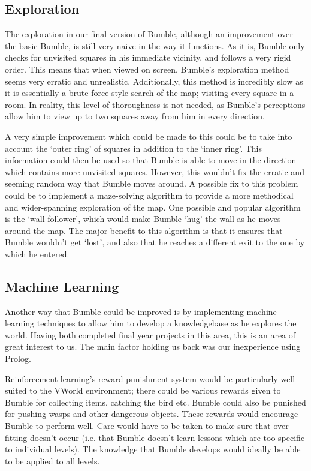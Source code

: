 \documentclass[a4paper,oneside]{report}
\begin{document}
\subsection{Exploration}

The exploration in our final version of Bumble, although an improvement over the basic Bumble, is still very naive in the way it functions. As it is, Bumble only checks for unvisited squares in his immediate vicinity, and follows a very rigid order. This means that when viewed on screen, Bumble's exploration method seems very erratic and unrealistic. Additionally, this method is incredibly slow as it is essentially a brute-force-style search of the map; visiting every square in a room. In reality, this level of thoroughness is not needed, as Bumble's perceptions allow him to view up to two squares away from him in every direction. 

A very simple improvement which could be made to this could be to take into account the `outer ring' of squares in addition to the `inner ring'. This information could then be used so that Bumble is able to move in the direction which contains more unvisited squares. However, this wouldn't fix the erratic and seeming random way that Bumble moves around. A possible fix to this problem could be to implement a maze-solving algorithm to provide a more methodical and wider-spanning exploration of the map. One possible and popular algorithm is the `wall follower', which would make Bumble `hug' the wall as he moves around the map. The major benefit to this algorithm is that it ensures that Bumble wouldn't get `lost', and also that he reaches a different exit to the one by which he entered.

\subsection{Machine Learning}

Another way that Bumble could be improved is by implementing machine learning techniques to allow him to develop a knowledgebase as he explores the world. Having both completed final year projects in this area, this is an area of great interest to us. The main factor holding us back was our inexperience using Prolog. 

Reinforcement learning's reward-punishment system would be particularly well suited to the VWorld environment; there could be various rewards given to Bumble for collecting items, catching the bird etc. Bumble could also be punished for pushing wasps and other dangerous objects. These rewards would encourage Bumble to perform well. Care would have to be taken to make sure that over-fitting doesn't occur (i.e. that Bumble doesn't learn lessons which are too specific to individual levels). The knowledge that Bumble develops would ideally be able to be applied to all levels.
		
\end{document}
